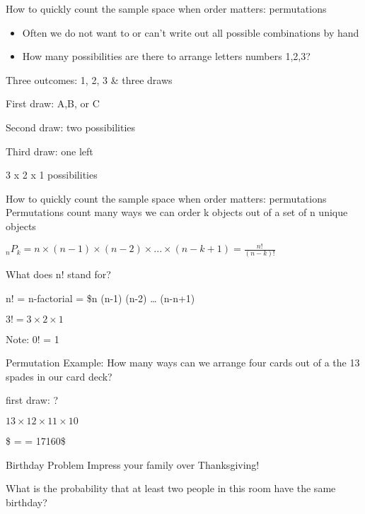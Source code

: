 \documentclass[presentation]{beamer}
\begin{document}
\begin{frame}[label={sec:org8108ed4}]{How to quickly count the sample space when order matters: permutations}
\begin{itemize}
\item Often we do not want to or can't write out all possible combinations by hand

\item How many possibilities are there to arrange letters numbers 1,2,3?
\end{itemize}

\pause

Three outcomes: 1, 2, 3 \& three draws

\pause
First draw: A,B, or C

Second draw: two possibilities

Third draw: one left

3 x 2 x 1 possibilities
\end{frame}

\begin{frame}[label={sec:orgd9b1777}]{How to quickly count the sample space when order matters: permutations}
Permutations count many ways we can \alert{order} k objects out of a set of n unique objects

\(_{n}P_{k} = n \times (n-1) \times (n-2) \times ... \times (n-k + 1) = \frac{n!}{(n-k)!}\)

What does n! stand for?

\pause

n! = n-factorial = \$n \texttimes{} (n-1) \texttimes{} (n-2) \texttimes{} \ldots{} \texttimes{} (n-n+1)

\(3! = 3 \times 2 \times 1\)

\alert{Note: 0! = 1}
\end{frame}


\begin{frame}[label={sec:org424f11f}]{Permutation Example:}
How many ways can we arrange four cards out of a the 13 spades in our card deck?

first draw: ?
\pause

\(13 \times 12 \times 11 \times 10\)

\pause

\$  =   = 17160\$
\end{frame}

\begin{frame}[label={sec:orgd1d72f6}]{Birthday Problem}
Impress your family over Thanksgiving!

What is the probability that at least two people in this room have the same birthday?
\end{frame}
\end{document}

